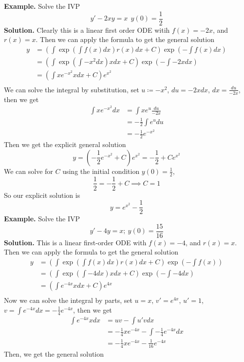 \documentclass[openany]{report}
\begin{document}
\textbf{Example.} Solve the IVP 
\[y' - 2xy = x \ \ y(0) = \frac{1}{2}\]
\textbf{Solution.} Clearly this is a linear first order ODE witih $f(x) = -2x$, and $r(x) = x$. Then we can apply the formula to get the general solution
\begin{align*}
    y &= \left(\int \exp\left(\int f(x)dx\right)r(x)dx +C \right)\exp\left(-\int f(x)dx\right)  \\
    &=  \left(\int \exp\left(\int -x^2dx\right)xdx + C\right)\exp\left(-\int -2xdx\right)\\
    &= \left(\int x e^{-x^2}xdx + C\right)e^{x^2}\\
\end{align*}
We can solve the integral by substitution, set $u \coloneqq -x^2$, $du = -2xdx$, $dx = \frac{du}{-2x}$, then we get 
\begin{align*}
    \int xe^{-x^2}dx &= \int xe^u \frac{du}{-2x}\\
    & = -\frac{1}{2}\int e^udu\\
    &= -\frac{1}{2} e^{-x^2}
\end{align*}
Then we get the explicit general solution
\[y =  \left(-\frac{1}{2}e^{-x^2} + C\right)  e^{x^2} = -\frac{1}{2} + Ce^{x^2}\]
We can solve for $C$ using the initial condition $y(0) = \frac{1}{2}$,
\[\frac{1}{2} = -\frac{1}{2} + C \implies C = 1\]
So our explicit solution is 
\[y = e^{x^2} -\frac{1}{2}\] 
\textbf{Example.} Solve the IVP
\[y' - 4y = x; \ y(0) = \frac{15}{16}\]
\textbf{Solution.} This is a linear first-order ODE with $f(x) = -4$, and $r(x) = x$. Then we can apply the formula to get the general solution
\begin{align*}
    y &= \left(\int \exp\left(\int f(x)dx\right)r(x)dx + C\right)\exp\left(-\int f(x)\right)\\
    &= \left(\int \exp\left(\int -4dx\right)xdx + C\right)\exp\left(-\int -4dx\right)\\
    &= \left(\int e^{-4x}xdx + C\right)e^{4x}\\
\end{align*}
Now we can solve the integral by parts, set $u = x$, $v' = e^{4x}$, $u' = 1$, $v = \int e^{-4x}dx = -\frac{1}{4}e^{-4x}$, then we get 
\begin{align*}
    \int e^{-4x}xdx &= uv - \int u'vdx\\
    &= -\frac{1}{4}xe^{-4x} - \int -\frac{1}{4}e^{-4x}dx\\
    &= -\frac{1}{4}xe^{-4x} - \frac{1}{16}e^{-4x}
\end{align*}
Then, we get the general solution 
\end{document}
